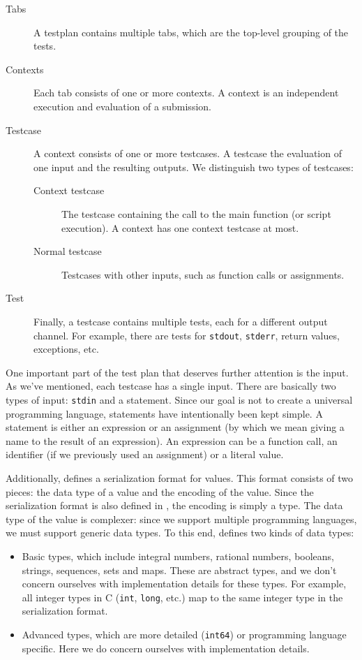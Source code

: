 \documentclass[5p,number]{elsarticle}
\begin{document}
    \begin{description}
        \item[Tabs] A testplan contains multiple tabs, which are the top-level grouping of the tests.
        \item[Contexts] Each tab consists of one or more contexts.
        A context is an independent execution and evaluation of a submission.
        \item[Testcase] A context consists of one or more testcases.
        A testcase the evaluation of one input and the resulting outputs.
        We distinguish two types of testcases:
        \begin{description}
            \item[Context testcase] The testcase containing the call to the main function (or script execution).
            A context has one context testcase at most.
            \item[Normal testcase] Testcases with other inputs, such as function calls or assignments.
        \end{description}
        \item[Test] Finally, a testcase contains multiple tests, each for a different output channel.
        For example, there are tests for \texttt{stdout}, \texttt{stderr}, return values, exceptions, etc.
    \end{description}

    One important part of the test plan that deserves further attention is the input.
    As we've mentioned, each testcase has a single input.
    There are basically two types of input: \texttt{stdin} and a statement.
    Since our goal is not to create a universal programming language, statements have intentionally been kept simple.
    A statement is either an expression or an assignment (by which we mean giving a name to the result of an expression).
    An expression can be a function call, an identifier (if we previously used an assignment) or a literal value.

    Additionally, \tested{} defines a serialization format for values.
    This format consists of two pieces: the data type of a value and the encoding of the value.
    Since the serialization format is also defined in , the encoding is simply a  type.
    The data type of the value is complexer: since we support multiple programming languages, we must support generic data types.
    To this end, \tested{} defines two kinds of data types:

    \begin{itemize}
        \item Basic types, which include integral numbers, rational numbers, booleans, strings, sequences, sets and maps.
        These are abstract types, and we don't concern ourselves with implementation details for these types.
        For example, all integer types in C (\texttt{int}, \texttt{long}, etc.) map to the same integer type in the serialization format.
        \item Advanced types, which are more detailed (\texttt{int64}) or programming language specific.
        Here we do concern ourselves with implementation details.
    \end{itemize}
\end{document}
